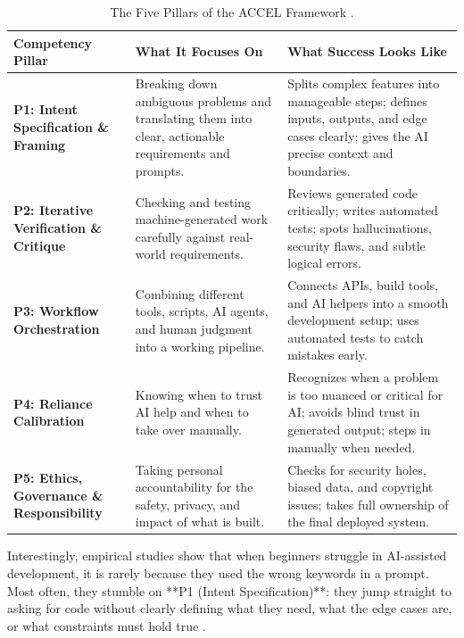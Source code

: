 \documentclass[11pt]{article}
\begin{document}
\begin{table}[htbp]
\centering
\small
\caption{The Five Pillars of the ACCEL Framework \citep{agenticengineer2026}.}
\label{tab:accel_pillars}
\begin{tabularx}{\linewidth}{p{2.8cm} >{\raggedright\arraybackslash}X >{\raggedright\arraybackslash}p{5.5cm}}
\toprule
\textbf{Competency Pillar} & \textbf{What It Focuses On} & \textbf{What Success Looks Like} \\
\midrule
\textbf{P1: Intent Specification \& Framing} & 
Breaking down ambiguous problems and translating them into clear, actionable requirements and prompts. & 
Splits complex features into manageable steps; defines inputs, outputs, and edge cases clearly; gives the AI precise context and boundaries. \\
\addlinespace
\textbf{P2: Iterative Verification \& Critique} & 
Checking and testing machine-generated work carefully against real-world requirements. & 
Reviews generated code critically; writes automated tests; spots hallucinations, security flaws, and subtle logical errors. \\
\addlinespace
\textbf{P3: Workflow Orchestration} & 
Combining different tools, scripts, AI agents, and human judgment into a working pipeline. & 
Connects APIs, build tools, and AI helpers into a smooth development setup; uses automated tests to catch mistakes early. \\
\addlinespace
\textbf{P4: Reliance Calibration} & 
Knowing when to trust AI help and when to take over manually. & 
Recognizes when a problem is too nuanced or critical for AI; avoids blind trust in generated output; steps in manually when needed. \\
\addlinespace
\textbf{P5: Ethics, Governance \& Responsibility} & 
Taking personal accountability for the safety, privacy, and impact of what is built. & 
Checks for security holes, biased data, and copyright issues; takes full ownership of the final deployed system. \\
\bottomrule
\end{tabularx}
\end{table}

Interestingly, empirical studies show that when beginners struggle in AI-assisted development, it is rarely because they used the wrong keywords in a prompt. Most often, they stumble on **P1 (Intent Specification)**: they jump straight to asking for code without clearly defining what they need, what the edge cases are, or what constraints must hold true \citep{agenticengineer2026}.
\end{document}
